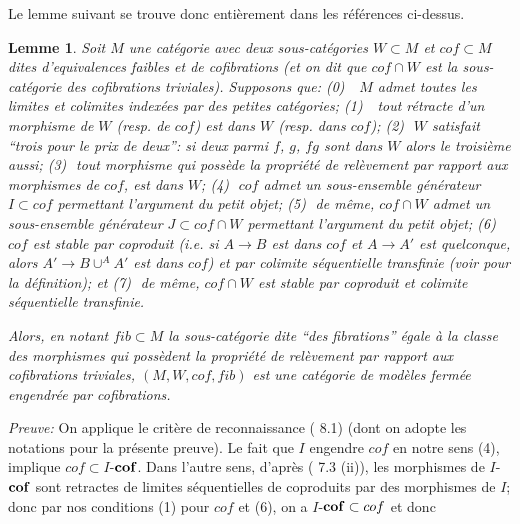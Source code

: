 \documentclass[12pt]{article}
\newtheorem{lemme}[lemma]{Lemme}
\begin{document}
Le lemme suivant se trouve donc
enti\`erement dans les r\'ef\'erences ci-dessus.
\begin{lemme}
\label{dhklemme}
Soit $M$ une cat\'egorie avec deux sous-cat\'egories $W\subset M$ et
$cof\subset M$
dites d'equivalences faibles et de cofibrations (et on dit que $cof \cap W$
est la
sous-cat\'egorie des cofibrations triviales). Supposons que:
\newline
(0) \,\, $M$ admet toutes les limites et colimites index\'ees par des petites
cat\'egories;
\newline
(1) \,\, tout r\'etracte d'un morphisme de $W$ (resp. de $cof$)
est dans $W$ (resp. dans $cof$);
\newline
(2)\,\, $W$ satisfait ``trois pour le prix de deux'': si deux parmi $f$, $g$,
$fg$ sont dans $W$ alors le troisi\`eme aussi;
\newline
(3)\,\, tout morphisme qui poss\`ede la propri\'et\'e de
rel\`evement par rapport aux morphismes de
$cof$, est dans $W$;
\newline
(4)\,\, $cof$ admet un sous-ensemble g\'en\'erateur $I\subset cof$ permettant
l'argument du petit objet;
\newline
(5)\,\, de m\^eme, $cof \cap W$ admet un sous-ensemble g\'en\'erateur
$J\subset cof\cap W$
permettant l'argument du petit objet;
\newline
(6)\,\, $cof$ est stable par coproduit (i.e. si $A\rightarrow B$ est
dans $cof$ et $A\rightarrow A'$ est quelconque, alors $A'\rightarrow B\cup ^AA'$
est dans $cof$) et par colimite s\'equentielle transfinie (voir
\cite{Hirschhorn} \cite{DHK} pour la d\'efinition); et
\newline
(7)\,\, de m\^eme, $cof \cap W$ est stable par coproduit et colimite
s\'equentielle
transfinie.

Alors, en notant $fib\subset M$ la sous-cat\'egorie dite ``des fibrations''
\'egale \`a la classe des morphismes qui poss\`edent la propri\'et\'e
de rel\`evement par rapport aux
cofibrations triviales, $(M,W,cof, fib)$ est une cat\'egorie de mod\`eles
ferm\'ee engendr\'ee par cofibrations.
\end{lemme}
{\em Preuve:}
On applique le crit\`ere de reconnaissance (\cite{DHK} 8.1) (dont on adopte les
notations pour la pr\'esente preuve). Le fait que $I$ engendre $cof$ en notre
sens (4), implique $cof \subset I$-${\bf cof}$.  Dans l'autre sens, d'apr\`es
(\cite{DHK} 7.3 (ii)), les morphismes de  $I$-${\bf cof}$ sont retractes de
limites s\'equentielles de coproduits par des morphismes de $I$; donc par nos
conditions (1) pour $cof$ et (6), on a $I$-${\bf cof}\subset cof$ et donc
\end{document}
